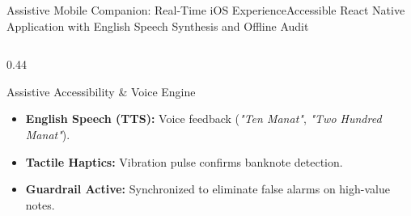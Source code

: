 \begin{frame}{Assistive Mobile Companion: Real-Time iOS Experience}{Accessible React Native Application with English Speech Synthesis and Offline Audit}
\begin{columns}[c]
\begin{column}{0.44\textwidth}
            \vspace{0.12cm}
            \begin{alertblockcustom}{Assistive Accessibility \& Voice Engine}
                \scriptsize
                \begin{itemize}\setlength{\itemsep}{1.5pt}
                    \item \textbf{English Speech (TTS):} Voice feedback (\textit{"Ten Manat"}, \textit{"Two Hundred Manat"}).
                    \item \textbf{Tactile Haptics:} Vibration pulse confirms banknote detection.
                    \item \textbf{Guardrail Active:} Synchronized to eliminate false alarms on high-value notes.
                \end{itemize}
            \end{alertblockcustom}
        \end{column}
    \end{columns}
\end{frame}
